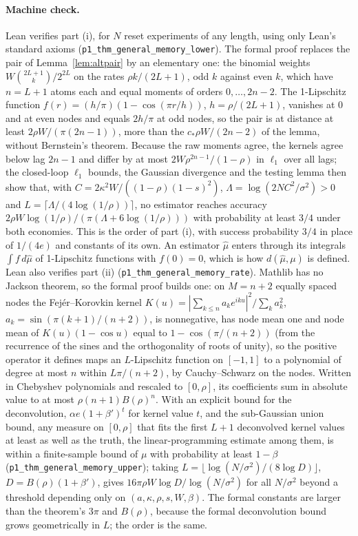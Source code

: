 \paragraph{Machine check.} Lean verifies part (i), for $N$ reset experiments of any length, using only Lean's standard axioms (\texttt{p1\_thm\_general\_memory\_lower}). The formal proof replaces the pair of Lemma~\ref{lem:altpair} by an elementary one: the binomial weights $W\binom{2L+1}{k}/2^{2L}$ on the rates $\rho k/(2L+1)$, odd $k$ against even $k$, which have $n=L+1$ atoms each and equal moments of orders $0,\ldots,2n-2$. The 1-Lipschitz function $f(r)=(h/\pi)(1-\cos(\pi r/h))$, $h=\rho/(2L+1)$, vanishes at $0$ and at even nodes and equals $2h/\pi$ at odd nodes, so the pair is at distance at least $2\rho W/(\pi(2n-1))$, more than the $c_*\rho W/(2n-2)$ of the lemma, without Bernstein's theorem. Because the raw moments agree, the kernels agree below lag $2n-1$ and differ by at most $2W\rho^{2n-1}/(1-\rho)$ in $\ell_1$ over all lags; the closed-loop $\ell_1$ bounds, the Gaussian divergence and the testing lemma then show that, with $C=2\kappa^2W/((1-\rho)(1-s)^2)$, $\Lambda=\log(2NC^2/\sigma^2)>0$ and $L=\lceil\Lambda/(4\log(1/\rho))\rceil$, no estimator reaches accuracy $2\rho W\log(1/\rho)/(\pi(\Lambda+6\log(1/\rho)))$ with probability at least $3/4$ under both economies. This is the order of part (i), with success probability $3/4$ in place of $1/(4e)$ and constants of its own. An estimator $\hat\mu$ enters through its integrals $\int f\,d\hat\mu$ of 1-Lipschitz functions with $f(0)=0$, which is how $d(\hat\mu,\mu)$ is defined. Lean also verifies part (ii) (\texttt{p1\_thm\_general\_memory\_rate}). Mathlib has no Jackson theorem, so the formal proof builds one: on $M=n+2$ equally spaced nodes the Fejér--Korovkin kernel $K(u)=|\sum_{k\le n}a_ke^{iku}|^2/\sum_ka_k^2$, $a_k=\sin(\pi(k+1)/(n+2))$, is nonnegative, has node mean one and node mean of $K(u)(1-\cos u)$ equal to $1-\cos(\pi/(n+2))$ (from the recurrence of the sines and the orthogonality of roots of unity), so the positive operator it defines maps an $L$-Lipschitz function on $[-1,1]$ to a polynomial of degree at most $n$ within $L\pi/(n+2)$, by Cauchy--Schwarz on the nodes. Written in Chebyshev polynomials and rescaled to $[0,\rho]$, its coefficients sum in absolute value to at most $\rho(n+1)B(\rho)^n$. With an explicit bound for the deconvolution, $\alpha e(1+\beta')^t$ for kernel value $t$, and the sub-Gaussian union bound, any measure on $[0,\rho]$ that fits the first $L+1$ deconvolved kernel values at least as well as the truth, the linear-programming estimate among them, is within a finite-sample bound of $\mu$ with probability at least $1-\beta$ (\texttt{p1\_thm\_general\_memory\_upper}); taking $L=\lfloor\log(N/\sigma^2)/(8\log D)\rfloor$, $D=B(\rho)(1+\beta')$, gives $16\pi\rho W\log D/\log(N/\sigma^2)$ for all $N/\sigma^2$ beyond a threshold depending only on $(a,\kappa,\rho,s,W,\beta)$. The formal constants are larger than the theorem's $3\pi$ and $B(\rho)$, because the formal deconvolution bound grows geometrically in $L$; the order is the same.

